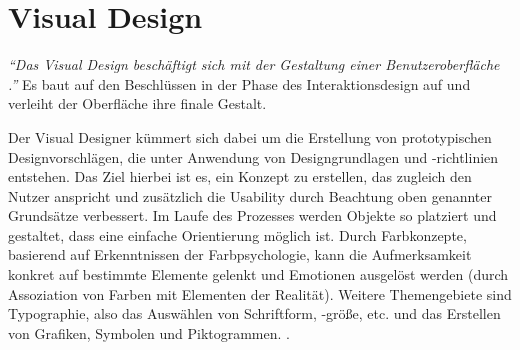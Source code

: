 \section{Visual Design} \label{sec:uid}
\textit{\enquote{Das Visual Design beschäftigt sich mit der Gestaltung einer Benutzeroberfläche \cite[S. 182]{Ullenboom2014}.}} Es baut auf den Beschlüssen in der Phase des Interaktionsdesign auf und verleiht der Oberfläche ihre finale Gestalt.\par
Der Visual Designer kümmert sich dabei um die Erstellung von prototypischen Designvorschlägen, die unter Anwendung von Designgrundlagen und -richtlinien entstehen. Das Ziel hierbei ist es, ein Konzept zu erstellen, das zugleich den Nutzer anspricht und zusätzlich die Usability durch Beachtung oben genannter Grundsätze verbessert. Im Laufe des Prozesses werden Objekte so platziert und gestaltet, dass eine einfache Orientierung möglich ist. Durch Farbkonzepte, basierend auf Erkenntnissen der Farbpsychologie, kann die Aufmerksamkeit konkret auf bestimmte Elemente gelenkt und Emotionen ausgelöst werden (durch Assoziation von Farben mit Elementen der Realität). Weitere Themengebiete sind Typographie, also das Auswählen von Schriftform, -größe, etc. und das Erstellen von Grafiken, Symbolen und Piktogrammen. \cite[S. 182]{Ullenboom2014}.

